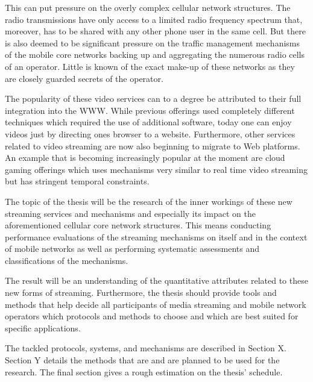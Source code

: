 This can put pressure on the overly complex cellular network structures. The radio transmissions have only access to a limited radio frequency spectrum that, moreover, has to be shared with any other phone user in the same cell. But there is also deemed to be significant pressure on the traffic management mechanisms of the mobile core networks backing up and aggregating the numerous radio cells of an operator. Little is known of the exact make-up of these networks as they are closely guarded secrets of the operator.

The popularity of these video services can to a degree be attributed to their full integration into the WWW. While previous offerings used completely different techniques which required the use of additional software, today one can enjoy videos just by directing ones browser to a website. Furthermore, other services related to video streaming are now also beginning to migrate to Web platforms. An example that is becoming increasingly popular at the moment are cloud gaming offerings which uses mechanisms very similar to real time video streaming but has stringent temporal constraints.


The topic of the thesis will be the research of the inner workings of these new streaming services and mechanisms and especially its impact on the aforementioned cellular core network structures. This means conducting performance evaluations of the streaming mechanisms on itself and in the context of mobile networks as well as performing systematic assessments and classifications of the mechanisms. 

The result will be an understanding of the quantitative attributes related to these new forms of streaming. Furthermore, the thesis should provide tools and methods that help decide all participants of media streaming and mobile network operators which protocols and methods to choose and which are best suited for specific applications.

The tackled protocols, systems, and mechanisms are described in Section X. Section Y details the methods that are and are planned to be used for the research. The final section gives a rough estimation on the thesis' schedule.




